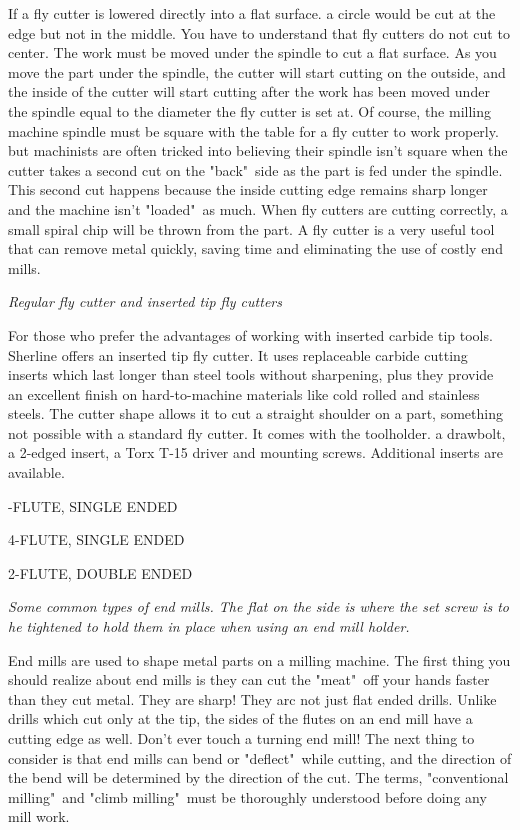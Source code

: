 If a fly cutter is lowered directly into a flat surface. a circle would be cut
at the edge but not in the middle. You have to understand that fly cutters do
not cut to center. The work must be moved under the spindle to cut a flat
surface. As you move the part under the spindle, the cutter will start cutting
on the outside, and the inside of the cutter will start cutting after the work
has been moved under the spindle equal to the diameter the fly cutter is set at.
Of course, the milling machine spindle must be square with the table for a fly
cutter to work properly. but machinists are often tricked into believing their
spindle isn't square when the cutter takes a second cut on the "back"\ side as
the part is fed under the spindle. This second cut happens because the inside
cutting edge remains sharp longer and the machine isn't "loaded"\ as much. When
fly cutters are cutting correctly, a small spiral chip will be thrown from the
part. A fly cutter is a very useful tool that can remove metal quickly, saving
time and eliminating the use of costly end mills.

\bigskip
\textit{Regular fly cutter and inserted tip fly cutters}
\bigskip


For those who prefer the advantages of working with inserted carbide tip tools.
Sherline offers an inserted tip fly cutter. It uses replaceable carbide cutting
inserts which last longer than steel tools without sharpening, plus they provide
an excellent finish on hard-to-machine materials like cold rolled and stainless
steels. The cutter shape allows it to cut a straight shoulder on a part,
something not possible with a standard fly cutter. It comes with the toolholder.
a drawbolt, a 2-edged insert, a Torx T-15 driver and mounting screws. Additional
inserts are available.


-FLUTE, SINGLE ENDED

4-FLUTE, SINGLE ENDED 

2-FLUTE, DOUBLE ENDED
\bigskip

\textit{Some common types of end mills. The flat on the side is where the set
screw is to he tightened to hold them in place when using an end mill holder.}
\bigskip

End mills are used to shape metal parts on a milling machine. The first thing
you should realize about end mills is they can cut the "meat"\ off your hands
faster than they cut metal. They are sharp! They arc not just flat ended drills.
Unlike drills which cut only at the tip, the sides of the flutes on an end mill
have a cutting edge as well. Don't ever touch a turning end mill! The next thing
to consider is that end mills can bend or "deflect"\ while cutting, and the
direction of the bend will be determined by the direction of the cut. The terms,
"conventional milling"\ and "climb milling"\ must be thoroughly understood before
doing any mill work.

